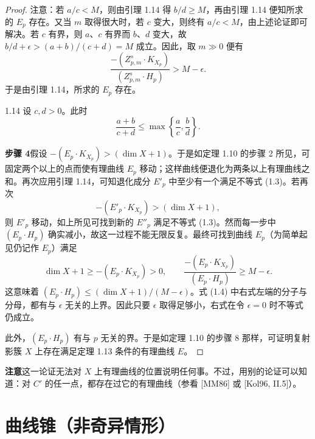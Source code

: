 \begin{proof}
注意：若 $a/c<M$，则由引理 1.14 得 $b/d\ge M$，再由引理 1.14 便知所求的 $E_p$ 存在。又当 $m$ 取得很大时，若 $c$ 变大，则终有 $a/c<M$，由上述论证即可解决。若 $c$ 有界，则 $a$、$c$ 有界而 $b$、$d$ 变大，故 $b/d+\epsilon>(a+b)/(c+d)=M$ 成立。因此，取 $m\gg0$ 便有
\[ \frac{-(Z^s_{p,m}\cdot K_{X_p})}{(Z^s_{p,m}\cdot H_p)}>M-\epsilon. \]
于是由引理 1.14，所求的 $E_p$ 存在。

\begin{lemma}{1.14}
设 $c,d>0$。此时
\[ \frac{a+b}{c+d}\le\max\left\{\frac{a}{c},\frac{b}{d}\right\}. \]
\end{lemma}


\textbf{步骤 4}\quad 假设 $-(E_p\cdot K_{X_p})>(\dim X+1)$。于是如定理 1.10 的步骤 2 所见，可固定两个以上的点而使有理曲线 $E_p$ 移动；这样曲线便退化为两条以上有理曲线之和。再次应用引理 1.14，可知退化成分 $E'_p$ 中至少有一个满足不等式 (1.3)。若再次
\[ -(E'_p\cdot K_{X_p})>(\dim X+1), \]
则 $E'_p$ 移动，如上所见可找到新的 $E''_p$ 满足不等式 (1.3)。然而每一步中 $(E_p\cdot H_p)$ 确实减小，故这一过程不能无限反复。最终可找到曲线 $E_p$（为简单起见仍记作 $E_p$）满足
\begin{equation}\tag{1.4}
\dim X+1\ge -(E_p\cdot K_{X_p})>0,\qquad \frac{-(E_p\cdot K_{X_p})}{(E_p\cdot H_p)}\ge M-\epsilon.
\end{equation}
这意味着 $(E_p\cdot H_p)\le(\dim X+1)/(M-\epsilon)$。式 (1.4) 中右式左端的分子与分母，都有与 $\epsilon$ 无关的上界。因此只要 $\epsilon$ 取得足够小，右式在令 $\epsilon=0$ 时不等式仍成立。

此外，$(E_p\cdot H_p)$ 有与 $p$ 无关的界。于是如定理 1.10 的步骤 8 那样，可证明复射影簇 $X$ 上存在满足定理 1.13 条件的有理曲线 $E$。
\end{proof}

\par\medskip\noindent\textbf{注意}\quad 这一论证无法对 $X$ 上有理曲线的位置说明任何事。不过，用别的论证可以知道：对 $C'$ 的任一点，都存在过它的有理曲线（参看 [MM86] 或 [Kol96, II.5]）。

\section{曲线锥（非奇异情形）}



